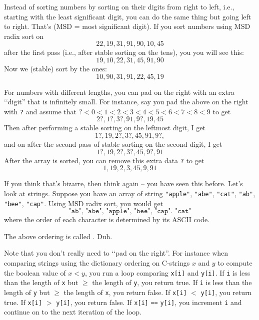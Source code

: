 Instead of sorting numbers by sorting on their digits from right to left, i.e.,
starting with the least significant digit,
you can do the same thing but going left to right.
That's  (MSD = most significant digit).
If you
sort numbers using MSD
radix sort on
\[
22, 19, 31, 91, 90, 10, 45
\]
after the first pass (i.e., after stable sorting on the tens), you 
you will see this:
\[
19, 10, 22, 31, 45, 91, 90
\]
Now we (stable) sort by the ones:
\[
10, 90, 31, 91, 22, 45, 19
\]




For numbers with different lengths, you can
pad on the right with an extra \lq\lq digit'' that is infinitely small.
For instance, say you pad the above on the right with \verb!?!
and assume that $? < 0 < 1 < 2 < 3 < 4 < 5 < 6 < 7 < 8 < 9$ to get
\[
2?, 1?, 3?, 91, 9?, 19, 45
\]
Then after performing a stable sorting on the leftmost digit, I get
\[
1?, 19, 2?, 3?, 45, 91, 9?, 
\]
and on after the second pass of stable sorting on the second digit, I get
\[
1?, 19, 2?, 3?, 45, 9?, 91  
\]
After the array is sorted, you can remove this extra data \verb!?! to get
\[
1, 19, 2, 3, 45, 9, 91  
\]

If you think that's bizarre, then think again -- you have
seen this before.
Let's look at strings.
Suppose you have an array of string
\verb!"apple"!,
\verb!"abe"!,
\verb!"cat"!,
\verb!"ab"!,
\verb!"bee"!,
\verb!"cap"!.
Using MSD radix sort, you would get
\[
\texttt{"ab",
"abe",
"apple",
"bee",
"cap".
"cat"}
\]
where the order of each character is determined by its ASCII code.

The above ordering is called . Duh.

Note that you  don't really need to \lq\lq pad on the right''.
For instance when comparing strings using the dictionary ordering
on C-strings $x$ and $y$ to compute the boolean value of
$x < y$,
you run a loop comparing \verb!x[i]! and \verb!y[i]!.
If \verb!i! is less than the length of \verb!x! but $\geq$ the length of
\verb!y!,
you return true.
If \verb!i! is less than the length of \verb!y! but $\geq$ the length of
\verb!x!,
you return false.
If \verb!x[i]! $<$ \verb!y[i]!, you return true.
If \verb!x[i]! $>$ \verb!y[i]!, you return false.
If \verb!x[i]! \verb!==! \verb!y[i]!, you increment \verb!i! and
continue on to the next iteration of the loop.
